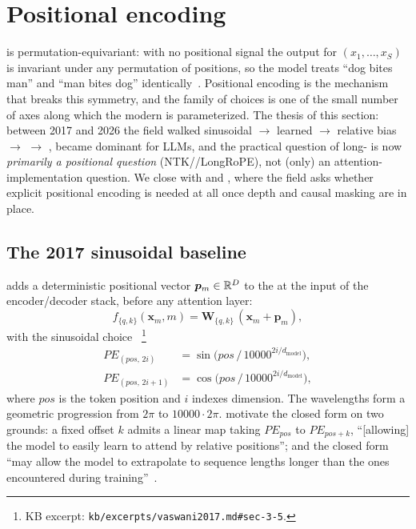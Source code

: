 \section{Positional encoding}
\label{sec:positional-encoding}
\label{sec:position}
\label{sec:positional}

 is permutation-equivariant: with no positional signal the
output for $(x_1, \ldots, x_S)$ is invariant under any permutation of
positions, so the model treats ``dog bites man'' and ``man bites dog''
identically~\citep{vaswani2017}. Positional encoding is the mechanism
that breaks this symmetry, and the family of choices is one of the
small number of axes along which the modern  is
parameterized. The thesis of this section: between 2017 and 2026 the
field walked sinusoidal $\to$ learned $\to$  relative bias $\to$
 $\to$ ,  became dominant for  LLMs, and the
practical question of long- is now \emph{primarily a
positional question} (NTK//LongRoPE), not (only) an attention-
implementation question. We close with  and , where the field
asks whether explicit positional encoding is needed at all once depth
and causal masking are in place.

\subsection{The 2017 sinusoidal baseline}
\label{sec:pos-sinusoidal}

\citet{vaswani2017} adds a deterministic positional vector
$\boldsymbol{p}_m \in \mathbb{R}^{D}$ to the  at the input of
the encoder/decoder stack, before any attention layer:
\begin{equation}
f_{\{q,k\}}(\boldsymbol{x}_m, m) = \boldsymbol{W}_{\{q,k\}}\,
   (\boldsymbol{x}_m + \boldsymbol{p}_m),
\label{eq:pe-additive}
\end{equation}
with the sinusoidal choice~\citep[\S 3.5]{vaswani2017}%
\footnote{KB excerpt: \texttt{kb/excerpts/vaswani2017.md\#sec-3-5}.}
\begin{equation}
\begin{aligned}
PE_{(pos,\,2i)}     &= \sin\!\bigl(pos\,/\,10000^{2i/d_{\text{model}}}\bigr), \\
PE_{(pos,\,2i+1)}   &= \cos\!\bigl(pos\,/\,10000^{2i/d_{\text{model}}}\bigr),
\end{aligned}
\label{eq:pe-sinusoidal}
\end{equation}
where $pos$ is the token position and $i$ indexes dimension. The
wavelengths form a geometric progression from $2\pi$ to
$10000 \cdot 2\pi$. \citet{vaswani2017} motivate the closed form on two
grounds: a fixed offset $k$ admits a linear map taking $PE_{pos}$ to
$PE_{pos+k}$, ``[allowing] the model to easily learn to attend by
relative positions''; and the closed form ``may allow the model to
extrapolate to sequence lengths longer than the ones encountered during
training''~\citep[\S 3.5]{vaswani2017}.

